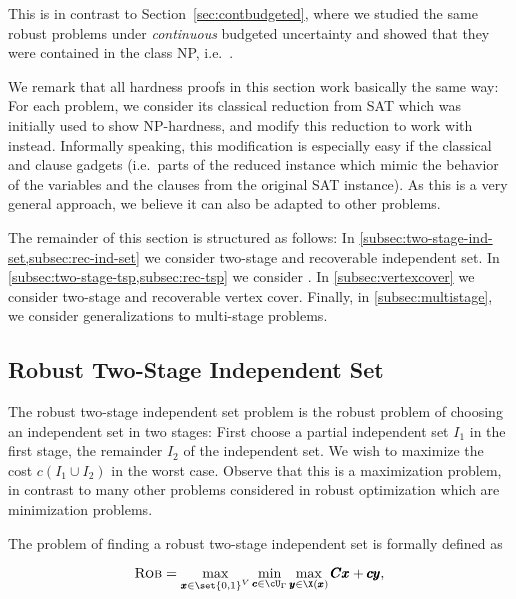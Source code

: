 \documentclass[a4paper,abstracton]{scrartcl}
\begin{document}
This is in contrast to Section~\ref{sec:contbudgeted}, where we studied the same robust problems under \emph{continuous} budgeted uncertainty and showed that they were contained in the class NP, i.e.\ .

We remark that all hardness proofs in this section work basically the same way: For each problem, we consider its classical reduction from SAT which was initially used to show NP-hardness, and modify this reduction to work with {\radj} instead. Informally speaking, this modification is especially easy if the classical  and clause gadgets (i.e.\ parts of the reduced instance which mimic the behavior of the variables and the clauses from the original SAT instance). As this is a very general approach, we believe it can also be adapted to other problems.

The remainder of this section is structured as follows: In \cref{subsec:two-stage-ind-set,subsec:rec-ind-set} we consider two-stage and recoverable independent set. In \cref{subsec:two-stage-tsp,subsec:rec-tsp} we consider . In \cref{subsec:vertexcover} we consider two-stage and recoverable vertex cover. Finally, in \cref{subsec:multistage}, we consider generalizations to multi-stage problems.



\subsection{Robust Two-Stage Independent Set}
\label{subsec:two-stage-ind-set}


The robust two-stage independent set problem is the robust problem of choosing an independent set in two stages: First choose a partial independent set $I_1$ in the first stage,  the remainder $I_2$ of the independent set. We wish to maximize the cost $c(I_1 \cup I_2)$ in the worst case. Observe that this is a maximization problem, in contrast to many other problems considered in robust optimization which are minimization problems.

 The problem of finding a robust two-stage independent set is formally defined as

\begin{equation*}
\textsc{Rob} = \max_{\pmb x \in \set{0,1}^V} \min_{\pmb c \in \cU_\Gamma } \max_{\pmb y \in \X(\pmb x)} \pmb C \pmb x + \pmb c \pmb y, 
\end{equation*} 
\end{document}
